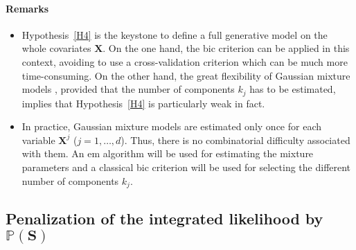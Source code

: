 \documentclass[12pt,a4paper]{report}
\begin{document}
\paragraph{Remarks}\begin{itemize}
	\item Hypothesis~\ref{H4} is the keystone to define a full generative model on the whole covariates $\boldsymbol{X}$. On the one hand, the {\sc bic} criterion can be applied in this context, avoiding to use a cross-validation criterion which can be much more time-consuming. On the other hand, the great flexibility  of Gaussian mixture models \cite{mclachlan2004finite}, provided that the number of components $k_j$ has to be estimated, implies that Hypothesis~\ref{H4} is particularly weak in fact.
\item In practice, Gaussian mixture models are estimated only once for each variable $\boldsymbol{X}^j$ ($j=1,\ldots,d$). Thus, there is no combinatorial difficulty associated with them. An {\sc em} algorithm \cite{dempster1977maximum} will be used for estimating the mixture parameters and a classical {\sc bic} criterion \cite{Sch1978} will be used for selecting the different number of components $k_j$.
\end{itemize}	
	


%			
%			
%		
%		
%		
%		
		\subsection{Penalization of the integrated likelihood by $\mathbb{P}(\boldsymbol{S})$} \label{compstruct}
		
\end{document}
